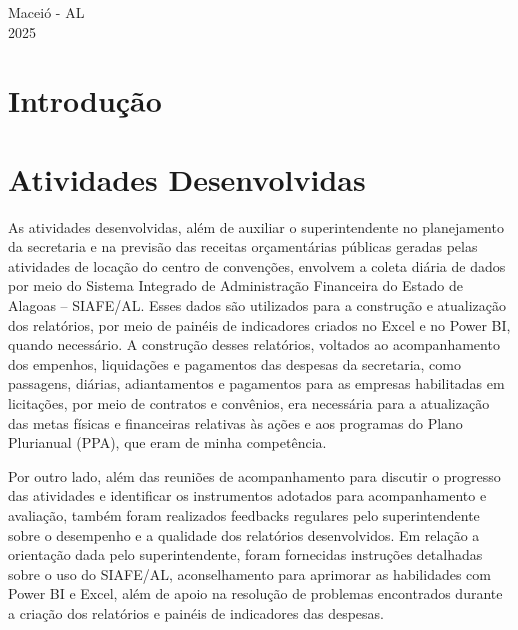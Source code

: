 \documentclass[12pt,a4paper]{article}
\begin{document}
	\vfill
	\begin{flushright}
		\centering Maceió - AL \\
		2025
	\end{flushright}
	
	\newpage
	
	\section{Introdução}
	
	\hspace*{1,5cm}
	
	\section{Atividades Desenvolvidas}
	


	\hspace*{1,5cm} As atividades desenvolvidas, além de auxiliar o superintendente no planejamento da secretaria e 
	na previsão das receitas orçamentárias públicas geradas pelas atividades de locação do centro de convenções, envolvem a coleta diária de dados por meio do Sistema Integrado de Administração Financeira do Estado de Alagoas – SIAFE/AL. Esses dados são utilizados para a construção e atualização dos relatórios, por meio de painéis de indicadores criados no Excel e no Power BI, quando necessário. A construção desses relatórios, voltados ao acompanhamento dos empenhos, liquidações e pagamentos das despesas da secretaria, como passagens, diárias, adiantamentos e pagamentos para as empresas habilitadas em licitações, por meio de contratos e convênios, era necessária para a atualização das metas físicas e financeiras relativas às ações e aos programas do Plano Plurianual (PPA), que eram de minha competência.  
	
	Por outro lado, além das reuniões de acompanhamento para discutir o progresso das atividades e identificar os instrumentos 
 	adotados para acompanhamento e avaliação, também foram realizados feedbacks regulares pelo superintendente sobre o desempenho e a 
 	qualidade dos relatórios desenvolvidos. Em relação a orientação dada pelo superintendente, foram fornecidas instruções detalhadas sobre o uso do SIAFE/AL, 
 	aconselhamento para aprimorar as habilidades com Power BI e Excel, além de apoio na resolução de problemas encontrados durante a criação dos relatórios e painéis de indicadores das despesas.  
 	
\end{document}
